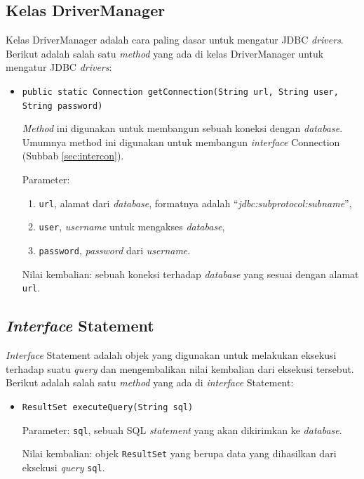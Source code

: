 \subsection{Kelas DriverManager}
\label{sec:drivermanager}
Kelas DriverManager adalah cara paling dasar untuk mengatur JDBC \textit{drivers}\cite{javadocumentation}. Berikut adalah salah satu \textit{method} yang ada di kelas DriverManager untuk mengatur JDBC \textit{drivers}:
\begin{itemize}
	\item \texttt{public static Connection getConnection(String url, String user, String password)}
	
	\textit{Method} ini digunakan untuk membangun sebuah koneksi dengan \textit{database}. Umumnya method ini digunakan untuk membangun \textit{interface} Connection (Subbab \ref{sec:intercon}).
	
	Parameter:
	\begin{enumerate}
		\item \texttt{url}, alamat dari \textit{database}, formatnya adalah ``\textit{jdbc:\textit{subprotocol}:\textit{subname}}'',
		\item \texttt{user}, \textit{username} untuk mengakses \textit{database},
		\item \texttt{password}, \textit{password} dari \textit{username}.
	\end{enumerate}
	
	Nilai kembalian: sebuah koneksi terhadap \textit{database} yang sesuai dengan alamat \texttt{url}.
\end{itemize}

\subsection{\textit{Interface} Statement}
\label{sec:statement}
\textit{Interface} Statement adalah objek yang digunakan untuk melakukan eksekusi terhadap suatu \textit{query} dan mengembalikan nilai kembalian dari eksekusi tersebut\cite{javadocumentation}. Berikut adalah salah satu \textit{method} yang ada di \textit{interface} Statement:
\begin{itemize}
	\item \texttt{ResultSet executeQuery(String sql)}
	
	Parameter: \texttt{sql}, sebuah SQL \textit{statement} yang akan dikirimkan ke \textit{database}.
	
	Nilai kembalian: objek \texttt{ResultSet} yang berupa data yang dihasilkan dari eksekusi \textit{query} \texttt{sql}.
\end{itemize}

